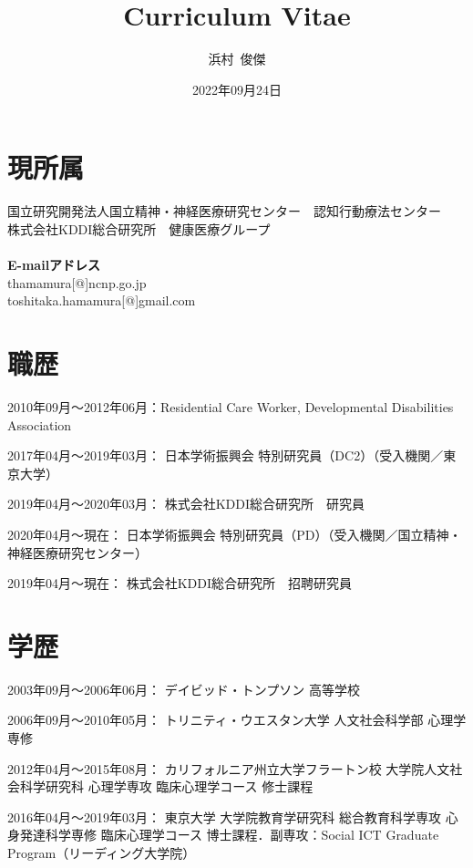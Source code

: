 \documentclass{article}
\begin{document}
\title{Curriculum Vitae}
\author{浜村\ 俊傑}
\date{2022年09月24日}
\maketitle

\noindent
\section{現所属}
国立研究開発法人国立精神・神経医療研究センター　認知行動療法センター\\
株式会社KDDI総合研究所　健康医療グループ\\~\\
\textbf{E-mailアドレス}\\
thamamura[@]ncnp.go.jp\\
toshitaka.hamamura[@]gmail.com

\section{職歴}
\begin{description}
	\item 2010年09月～2012年06月：Residential Care Worker, Developmental Disabilities Association
	\item 2017年04月～2019年03月： 日本学術振興会 特別研究員（DC2）（受入機関／東京大学）
	\item 2019年04月～2020年03月： 株式会社KDDI総合研究所　研究員
	\item 2020年04月～現在： 日本学術振興会 特別研究員（PD）（受入機関／国立精神・神経医療研究センター）
	\item 2019年04月～現在： 株式会社KDDI総合研究所　招聘研究員
\end{description}

\section{学歴}
\begin{description}
	\item 2003年09月～2006年06月： デイビッド・トンプソン 高等学校
	\item 2006年09月～2010年05月： トリニティ・ウエスタン大学 人文社会科学部 心理学専修
	\item 2012年04月～2015年08月： カリフォルニア州立大学フラートン校 大学院人文社会科学研究科 心理学専攻 臨床心理学コース 修士課程
	\item 2016年04月～2019年03月： 東京大学 大学院教育学研究科 総合教育科学専攻 心身発達科学専修 臨床心理学コース 博士課程．副専攻：Social ICT Graduate Program（リーディング大学院）
\end{description}
\end{document}
